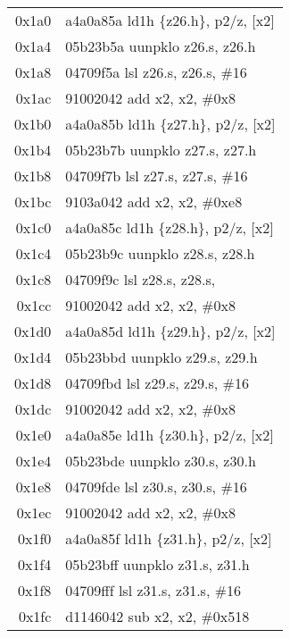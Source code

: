 \documentclass[11pt,a4paper]{article}
\begin{document}
\begin{longtable}{|r|l|}
\rowcolor{matrixload} 0x1a0 & a4a0a85a \quad ld1h \{z26.h\}, p2/z, [x2] \\
\rowcolor{conversion} 0x1a4 & 05b23b5a \quad uunpklo z26.s, z26.h \\
\rowcolor{conversion} 0x1a8 & 04709f5a \quad lsl z26.s, z26.s, \#16 \\
\rowcolor{address} 0x1ac & 91002042 \quad add x2, x2, \#0x8 \\
\rowcolor{matrixload} 0x1b0 & a4a0a85b \quad ld1h \{z27.h\}, p2/z, [x2] \\
\rowcolor{conversion} 0x1b4 & 05b23b7b \quad uunpklo z27.s, z27.h \\
\rowcolor{conversion} 0x1b8 & 04709f7b \quad lsl z27.s, z27.s, \#16 \\
\rowcolor{address} 0x1bc & 9103a042 \quad add x2, x2, \#0xe8 \\
\rowcolor{matrixload} 0x1c0 & a4a0a85c \quad ld1h \{z28.h\}, p2/z, [x2] \\
\rowcolor{conversion} 0x1c4 & 05b23b9c \quad uunpklo z28.s, z28.h \\
\rowcolor{conversion} 0x1c8 & 04709f9c \quad lsl z28.s, z28.s, #16 \\
\rowcolor{address} 0x1cc & 91002042 \quad add x2, x2, \#0x8 \\
\rowcolor{matrixload} 0x1d0 & a4a0a85d \quad ld1h \{z29.h\}, p2/z, [x2] \\
\rowcolor{conversion} 0x1d4 & 05b23bbd \quad uunpklo z29.s, z29.h \\
\rowcolor{conversion} 0x1d8 & 04709fbd \quad lsl z29.s, z29.s, \#16 \\
\rowcolor{address} 0x1dc & 91002042 \quad add x2, x2, \#0x8 \\
\rowcolor{matrixload} 0x1e0 & a4a0a85e \quad ld1h \{z30.h\}, p2/z, [x2] \\
\rowcolor{conversion} 0x1e4 & 05b23bde \quad uunpklo z30.s, z30.h \\
\rowcolor{conversion} 0x1e8 & 04709fde \quad lsl z30.s, z30.s, \#16 \\
\rowcolor{address} 0x1ec & 91002042 \quad add x2, x2, \#0x8 \\
\rowcolor{matrixload} 0x1f0 & a4a0a85f \quad ld1h \{z31.h\}, p2/z, [x2] \\
\rowcolor{conversion} 0x1f4 & 05b23bff \quad uunpklo z31.s, z31.h \\
\rowcolor{conversion} 0x1f8 & 04709fff \quad lsl z31.s, z31.s, \#16 \\
\rowcolor{address} 0x1fc & d1146042 \quad sub x2, x2, \#0x518 \\


\end{longtable}
\end{document}
